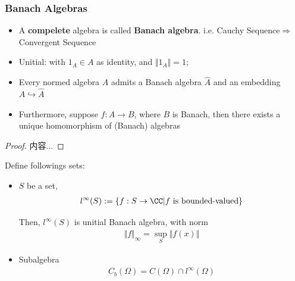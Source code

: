 \documentclass[Total.tex]{subfiles}
\begin{document}
		\subsubsection{Banach Algebras}
		\begin{Def}
			\begin{itemize}
				\item A \textbf{compelete} algebra is called \textbf{Banach algebra}. i.e. Cauchy Sequence$\Rightarrow$ Convergent Sequence
				\item Unitial: with $1_A\in A$ as identity, and $\Vert 1_A\Vert=1$;
			\end{itemize}
		\end{Def}
		
		\begin{proposition}
			\begin{itemize}
				\item 
				Every normed algebra $A$ admits a Banach algebra $\hat{A}$ and an embedding $A\hookrightarrow \hat{A}$
				
				\item Furthermore, suppose $f:A\rightarrow B$, where $B$ is Banach, then there exists a unique homomorphism of (Banach) algebras
				\begin{center}
				\end{center}
			\end{itemize}
		\end{proposition}
		\begin{proof}
			内容...
		\end{proof}
		
		Define followings sets:
		\begin{Def}
			\begin{itemize}
				\item $S$ be a set, 
				\begin{gather*}
					l^\infty(S):=\{f:S\rightarrow \CC|f\mbox{ is bounded-valued}\}
				\end{gather*}
				
				Then, $l^\infty(S)$ is unitial Banach algebra, with norm
				\begin{gather*}
					\Vert f\Vert_\infty=\sup_{S} \Vert f(x)\Vert
				\end{gather*}
				\item Subalgebra
				\begin{gather*}
					C_b(\Omega)=C(\Omega)\cap l^\infty(\Omega)
				\end{gather*}
			\end{itemize}
		\end{Def}
		
\end{document}

